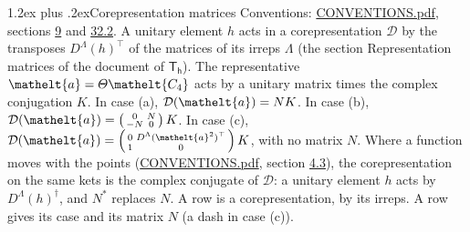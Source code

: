\documentclass[10pt,a4paper]{article}
\makeatletter
\renewcommand\section{\@startsection{section}{1}{\z@}{-3ex plus -1ex minus -.2ex}%
  {1.2ex plus .2ex}{\normalfont\large\sffamily\bfseries\color{parttitle}}}
\numberwithin{equation}{section}
\newcommand{\eltfont}[1]{{\let\sigma\eltsigma\mathelt{#1}}}
\newcommand{\grp}[1]{\mathsf{#1}}
\newcommand{\elt}[1]{\eltfont{#1}}
\makeatother
\begin{document}
\section{Corepresentation matrices}\label{s:corep_matrices}
Conventions: \href{../../CONVENTIONS.pdf}{CONVENTIONS.pdf}, sections \href{../../../rotation/CONVENTIONS.pdf\#conv.9}{9} and \href{../../CONVENTIONS.pdf\#conv.32.2}{32.2}.
A unitary element $h$ acts in a corepresentation $\mathcal{D}$ by the transposes $D^{\Lambda}(h)^{\top}$ of the matrices of its irreps $\Lambda$ (the section Representation matrices of the document of \href{../../../rotation/data/pdf/Th.pdf}{$\grp{T_{h}}$}). The representative $\elt{a} = \varTheta\elt{C_{4}}$ acts by a unitary matrix times the complex conjugation $K$.
In case (a), $\mathcal{D}(\elt{a}) = NK$. In case (b), $\mathcal{D}(\elt{a}) = \left(\begin{smallmatrix} 0 & N \\ -N & 0 \end{smallmatrix}\right) K$. In case (c), $\mathcal{D}(\elt{a}) = \left(\begin{smallmatrix} 0 & D^{\Lambda}(\elt{a}^2)^{\top} \\ 1 & 0 \end{smallmatrix}\right) K$, with no matrix $N$.
Where a function moves with the points (\href{../../CONVENTIONS.pdf}{CONVENTIONS.pdf}, section \href{../../../rotation/CONVENTIONS.pdf\#conv.4.3}{4.3}), the corepresentation on the same kets is the complex conjugate of $\mathcal{D}$: a unitary element $h$ acts by $D^{\Lambda}(h)^{\dagger}$, and $N^{*}$ replaces $N$.
A row is a corepresentation, by its irreps. A row gives its case and its matrix $N$ (a dash in case (c)).
\end{document}
